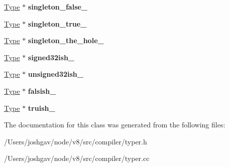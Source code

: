 \begin{DoxyCompactItemize}
\item 
\hyperlink{classv8_1_1internal_1_1_type}{Type} $\ast$ {\bfseries singleton\+\_\+false\+\_\+}\hypertarget{classv8_1_1internal_1_1compiler_1_1_typer_a9e6b62bbcd79b013a6f0c198ce2f0ae0}{}\label{classv8_1_1internal_1_1compiler_1_1_typer_a9e6b62bbcd79b013a6f0c198ce2f0ae0}

\item 
\hyperlink{classv8_1_1internal_1_1_type}{Type} $\ast$ {\bfseries singleton\+\_\+true\+\_\+}\hypertarget{classv8_1_1internal_1_1compiler_1_1_typer_a4dec4c1f998bcb8c9dd11809fd5c1584}{}\label{classv8_1_1internal_1_1compiler_1_1_typer_a4dec4c1f998bcb8c9dd11809fd5c1584}

\item 
\hyperlink{classv8_1_1internal_1_1_type}{Type} $\ast$ {\bfseries singleton\+\_\+the\+\_\+hole\+\_\+}\hypertarget{classv8_1_1internal_1_1compiler_1_1_typer_ad3f84cda1de0f3736be0c0e678325037}{}\label{classv8_1_1internal_1_1compiler_1_1_typer_ad3f84cda1de0f3736be0c0e678325037}

\item 
\hyperlink{classv8_1_1internal_1_1_type}{Type} $\ast$ {\bfseries signed32ish\+\_\+}\hypertarget{classv8_1_1internal_1_1compiler_1_1_typer_a168dd4db5dfcf0268b641579723ea5bc}{}\label{classv8_1_1internal_1_1compiler_1_1_typer_a168dd4db5dfcf0268b641579723ea5bc}

\item 
\hyperlink{classv8_1_1internal_1_1_type}{Type} $\ast$ {\bfseries unsigned32ish\+\_\+}\hypertarget{classv8_1_1internal_1_1compiler_1_1_typer_a050bfeaea1ae3e0871c9c4f48a69091b}{}\label{classv8_1_1internal_1_1compiler_1_1_typer_a050bfeaea1ae3e0871c9c4f48a69091b}

\item 
\hyperlink{classv8_1_1internal_1_1_type}{Type} $\ast$ {\bfseries falsish\+\_\+}\hypertarget{classv8_1_1internal_1_1compiler_1_1_typer_ad9af258e1ccd33944662e7e0f3beb696}{}\label{classv8_1_1internal_1_1compiler_1_1_typer_ad9af258e1ccd33944662e7e0f3beb696}

\item 
\hyperlink{classv8_1_1internal_1_1_type}{Type} $\ast$ {\bfseries truish\+\_\+}\hypertarget{classv8_1_1internal_1_1compiler_1_1_typer_ad2e61c4e1cab77df677a3d479a769fa8}{}\label{classv8_1_1internal_1_1compiler_1_1_typer_ad2e61c4e1cab77df677a3d479a769fa8}

\end{DoxyCompactItemize}


The documentation for this class was generated from the following files\+:\begin{DoxyCompactItemize}
\item 
/\+Users/joshgav/node/v8/src/compiler/typer.\+h\item 
/\+Users/joshgav/node/v8/src/compiler/typer.\+cc\end{DoxyCompactItemize}
